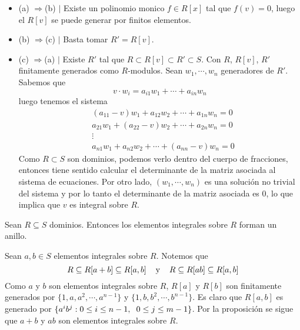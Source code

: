 \documentclass{article}
\begin{document}
\begin{dem}\hspace{4mm}
    \begin{itemize}
        \item (a) $\Rightarrow$(b) $|$ Existe un polinomio monico $f\in R[x]$ tal que $f(v)=0$, 
        luego el $R[v]$ se puede generar por finitos elementos.

        \item (b) $\Rightarrow$(c) $|$ Basta tomar $R'=R[v]$.
        
        \item (c) $\Rightarrow$(a) $|$ Existe $R'$ tal que $R\subset R[v]\subset R'\subset S$. Con
        $R$, $R[v]$, $R'$ finitamente generados como $R$-modulos. Sean $w_{1},\cdots,w_{n}$
        generadores de $R'$. Sabemos que
        \begin{equation*}
            v\cdot w_{i}=a_{i1}w_{1}+\cdots+a_{in}w_{n}
        \end{equation*}
        luego tenemos el sistema
        \begin{align*}
            & (a_{11}-v)w_{1}+a_{12}w_{2}+\cdots+a_{1n}w_{n}=0 \\
            & a_{21}w_{1}+(a_{22}-v)w_{2}+\cdots+a_{2n}w_{n}=0 \\
            & \vdots \\
            & a_{n1}w_{1}+a_{n2}w_{2}+\cdots+(a_{nn}-v)w_{n}=0
        \end{align*}
        Como $R\subset S$ son dominios, podemos verlo dentro del cuerpo de fracciones, entonces
        tiene sentido calcular el determinante de la matriz asociada al sistema de ecuaciones. Por
        otro lado, $(w_{1},\cdots,w_{n})$ es una solución no trivial del sistema y por lo tanto el
        determinante de la matriz asociada es $0$, lo que implica que $v$ es integral sobre $R$.
    \end{itemize}
\end{dem}

\begin{cor}
    Sean $R\subseteq S$ dominios. Entonces los elementos integrales sobre $R$ forman un anillo.
\end{cor}
\begin{dem}
    Sean $a,b\in S$ elementos integrales sobre $R$. Notemos que
    \begin{equation*}
        R\subseteq R[a+b]\subseteq R[a,b]\hspace{4mm}\text{y}\hspace{4mm}
        R\subseteq R[ab]\subseteq R[a,b]
    \end{equation*}
    Como $a$ y $b$ son elementos integrales sobre $R$, $R[a]$ y $R[b]$ son finitamente generados
    por $\{1,a,a^{2},\cdots,a^{n-1}\}$ y $\{1,b,b^{2},\cdots,b^{n-1}\}$. Es claro que
    $R[a,b]$ es generado por $\{a^{i}b^{j}:0\leq i\leq n-1,\hspace{2mm}0\leq j\leq m-1\}$. Por la
    proposición se sigue que $a+b$ y $ab$ son elementos integrales sobre $R$.
\end{dem}
\end{document}

